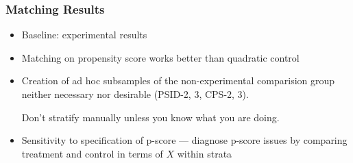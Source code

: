 \documentclass[notes=show,beamer,compress]{beamer}
\begin{document}
\begin{frame}
\frametitle{Matching Results}


\begin{itemize}

\item Baseline: experimental results
\item Matching on propensity score works better than quadratic control
\item Creation of ad hoc subsamples of the non-experimental comparision group neither necessary nor desirable (PSID-2, 3, CPS-2, 3).

Don't stratify manually unless you know what you are doing.
\item Sensitivity to specification of p-score --- diagnose p-score issues by comparing treatment and control in terms of $X$ within strata

\end{itemize}

\end{frame}
\end{document}

